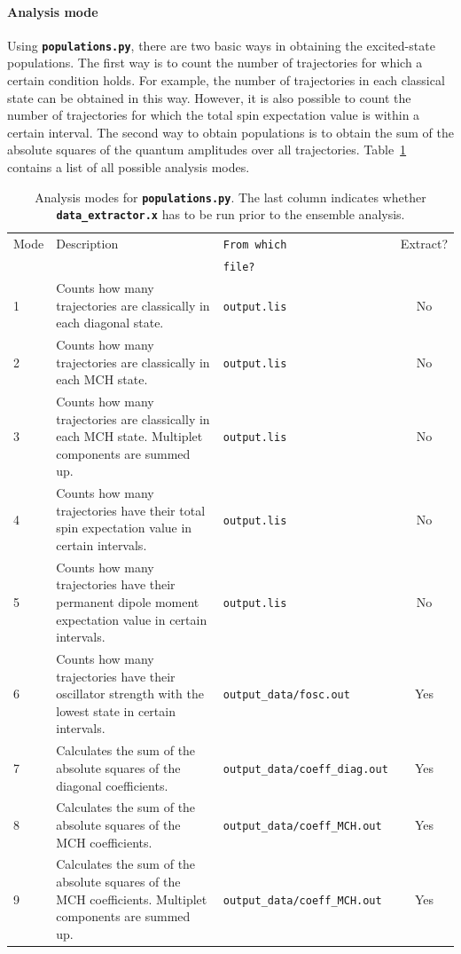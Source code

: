 \documentclass[a4paper,11pt,DIV=15,openany,twoside=false]{scrbook}
\newcommand{\ttt}[1]{\textbf{\texttt{#1}}}
\begin{document}
\paragraph{Analysis mode}

Using \ttt{populations.py}, there are two basic ways in obtaining the excited-state populations. The first way is to count the number of trajectories for which a certain condition holds. For example, the number of trajectories in each classical state can be obtained in this way. However, it is also possible to count the number of trajectories for which the total spin expectation value is within a certain interval. 
The second way to obtain populations is to obtain the sum of the absolute squares of the quantum amplitudes over all trajectories. Table~\ref{tab:Populations_modes} contains a list of all possible analysis modes.

\begin{table}
  \centering
  \caption{Analysis modes for \ttt{populations.py}. The last column indicates whether \ttt{data\_extractor.x} has to be run prior to the ensemble analysis.}
  \label{tab:Populations_modes}
  \begin{tabular}{lp{6cm}>{\tt}lc}
    \toprule
    Mode        &Description    &\rmfamily From which     &Extract?\\
                               &&\rmfamily file?          &\\
    \midrule
    1   &Counts how many trajectories are classically in each diagonal state. &output.lis  &No\\
    2   &Counts how many trajectories are classically in each MCH state. &output.lis  &No\\
    3   &Counts how many trajectories are classically in each MCH state. Multiplet components are summed up. &output.lis  &No\\
    4   &Counts how many trajectories have their total spin expectation value in certain intervals.   &output.lis &No\\
    5   &Counts how many trajectories have their permanent dipole moment expectation value in certain intervals.   &output.lis &No\\
    6   &Counts how many trajectories have their oscillator strength with the lowest state in certain intervals.        &output\_data/fosc.out  &Yes\\
    7   &Calculates the sum of the absolute squares of the diagonal coefficients.       &output\_data/coeff\_diag.out&Yes\\
    8   &Calculates the sum of the absolute squares of the MCH coefficients.       &output\_data/coeff\_MCH.out&Yes\\
    9   &Calculates the sum of the absolute squares of the MCH coefficients. Multiplet components are summed up.       &output\_data/coeff\_MCH.out&Yes\\
    \bottomrule
  \end{tabular}
\end{table}
\end{document}

